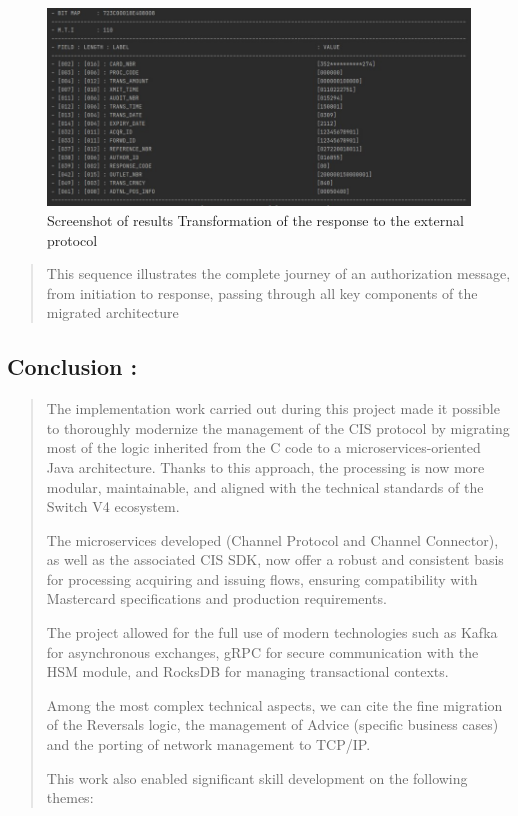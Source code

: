 \documentclass[12pt,a4paper]{report}
\begin{document}
\begin{figure}[H]
\centering
\includegraphics[width=\textwidth,height=\textheight,keepaspectratio]{media/image82.jpeg}
\caption{Screenshot of results
Transformation of the response to the external protocol}
\label{fig:RTREP}
\end{figure} 

\begin{quote}
This sequence illustrates the complete journey of an authorization
message, from initiation to response, passing through all key components
of the migrated architecture
\end{quote}


\subsection{Conclusion :}

\begin{quote}
The implementation work carried out during this project made it possible
to thoroughly modernize the management of the CIS protocol by migrating
most of the logic inherited from the C code to a microservices-oriented
Java architecture. Thanks to this approach, the processing is now more
modular, maintainable, and aligned with the technical standards of the
Switch V4 ecosystem.

The microservices developed (Channel Protocol and Channel Connector), as
well as the associated CIS SDK, now offer a robust and consistent basis
for processing acquiring and issuing flows, ensuring compatibility with
Mastercard specifications and production requirements.

The project allowed for the full use of modern technologies such as
Kafka for asynchronous exchanges, gRPC for secure communication with the
HSM module, and RocksDB for managing transactional contexts.

Among the most complex technical aspects, we can cite the fine migration
of the Reversals logic, the management of Advice (specific business
cases) and the porting of network management to TCP/IP.

This work also enabled significant skill development on the following
themes:
\end{quote}
\end{document}
